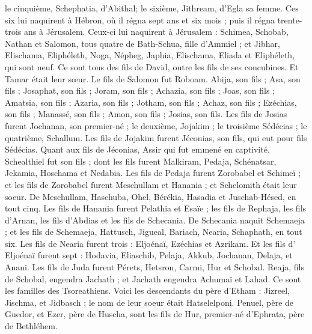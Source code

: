 \begin{multicols}{2}
le cinquième, Schephatia, d'Abithal; le sixième, Jithream, d'Egla sa femme.
Ces six lui naquirent à Hébron, où il régna sept ans et six mois ; puis il régna trente-trois ans à Jérusalem.
Ceux-ci lui naquirent à Jérusalem : Schimea, Schobab, Nathan et Salomon, tous quatre de Bath-Schua, fille d'Ammiel ;
et Jibhar, Elischama, Eliphéleth,
Noga, Népheg, Japhia,
Elischama, Eliada et Eliphéleth, qui sont neuf.
Ce sont tous des fils de David, outre les fils de ses concubines. Et Tamar était leur sœur.
Le fils de Salomon fut  Roboam. Abija, son fils ; Asa, son fils ; Josaphat, son fils ;
Joram, son fils ; Achazia, son fils ; Joas, son fils ;
Amatsia, son fils ; Azaria, son fils ; Jotham, son fils ;
Achaz, son fils ; Ezéchias, son fils ; Manassé, son fils ;
Amon, son fils ; Josias, son fils.
Les fils de Josias furent Jochanan, son premier-né ; le deuxième, Jojakim ; le troisième Sédécias ; le quatrième, Schallum.
Les fils de Jojakim furent  Jéconias, son fils, qui eut pour fils Sédécias.
Quant aux fils de Jéconias, Assir qui fut emmené en captivité, Schealthiel fut son fils ;
dont les fils furent Malkiram, Pedaja, Schénatsar, Jekamia, Hoschama et Nedabia.
Les fils de Pedaja furent Zorobabel et Schimeï ; et les fils de Zorobabel furent Meschullam et Hanania ; et Schelomith était leur soeur.
De Meschullam, Haschuba, Ohel, Bérékia, Hasadia et Juschab-Hésed, en tout cinq.
Les fils de Hanania furent  Pelathia et Esaïe ; les fils de Rephaja, les fils d'Arnan, les fils d’Abdias et les fils de Schecania.
De Schecania naquit Schemaeja ; et les fils de Schemaeja, Hattusch, Jigueal, Bariach, Nearia, Schaphath, en tout six.
Les fils de Nearia furent trois : Eljoénaï, Ezéchias et Azrikam.
Et les fils d' Eljoénaï furent  sept : Hodavia, Eliaschib, Pelaja, Akkub, Jochanan, Delaja, et Anani.
\VerseOne{}Les fils de Juda furent Pérets, Hetsron, Carmi, Hur et Schobal.
Reaja, fils de Schobal, engendra Jachath ; et Jachath engendra Achumaï et Lahad. Ce sont les familles des Tsoreathiens.
Voici les descendants du père d’Etham : Jizreel, Jischma, et Jidbasch ; le nom de leur soeur était Hatselelponi.
Penuel, père de Guedor, et Ezer, père de Huscha, sont les fils de Hur, premier-né d'Ephrata, père de Bethléhem.

\end{multicols}
